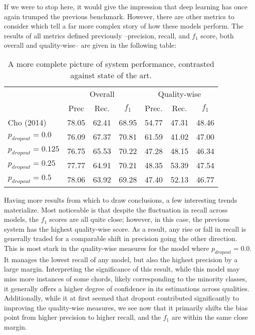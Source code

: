 If we were to stop here, it would give the impression that deep learning has once again trumped the previous benchmark.
However, there are other metrics to consider which tell a far more complex story of how these models perform.
The results of all metrics defined previously --precision, recall, and $f_1$ score, both overall and quality-wise-- are given in the following table:

\begin{table}[h]
\begin{center}
\caption{A more complete picture of system performance, contrasted against state of the art.}
\label{tab:base_stats}
\begin{tabular}{l | c c c | c c c |}
                      & \multicolumn{3}{c}{Overall} & \multicolumn{3}{c}{Quality-wise} \\
                      & Prec    & Rec.    & $f_1$   & Prec.     & Rec.      & $f_1$    \\
\hline
Cho (2014)            & 78.05   & 62.41   & 68.95   & 54.77     & 47.31     & 48.46    \\
\hline
$p_{dropout} = 0.0$   & 76.09   & 67.37   & 70.81   & 61.59     & 41.02     & 47.00    \\
$p_{dropout} = 0.125$ & 76.75   & 65.53   & 70.22   & 47.28     & 48.15     & 46.34    \\
$p_{dropout} = 0.25$  & 77.77   & 64.91   & 70.21   & 48.35     & 53.39     & 47.54    \\
$p_{dropout} = 0.5$   & 78.06   & 63.92   & 69.28   & 47.40     & 52.13     & 46.77    \\
\hline
\end{tabular}
\end{center}
\end{table}

Having more results from which to draw conclusions, a few interesting trends materialize.
Most noticeable is that despite the fluctuation in recall across models, the $f_1$ scores are all quite close; however, in this case, the previous system has the highest quality-wise score.
As a result, any rise or fall in recall is generally traded for a comparable shift in precision going the other direction.
This is most stark in the quality-wise measures for the model where $p_{dropout} = 0.0$.
It manages the lowest recall of any model, but also the highest precision by a large margin.
Interpreting the significance of this result, while this model may miss more instances of some chords, likely corresponding to the minority classes, it generally offers a higher degree of confidence in its estimations across qualities.
Additionally, while it at first seemed that dropout contributed significantly to improving the quality-wise measures, we see now that it primarily shifts the bias point from higher precision to higher recall, and the $f_1$ are within the same close margin.


